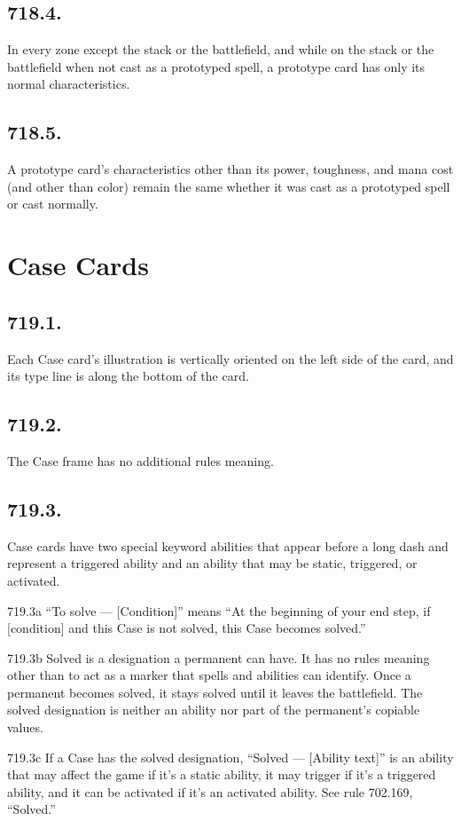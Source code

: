\subsection*{718.4.}
In every zone except the stack or the battlefield, and while on the stack or the battlefield when not cast as a prototyped spell, a prototype card has only its normal characteristics.

\subsection*{718.5.}
A prototype card’s characteristics other than its power, toughness, and mana cost (and other than color) remain the same whether it was cast as a prototyped spell or cast normally.

\section{Case Cards}
\subsection*{719.1.}
Each Case card’s illustration is vertically oriented on the left side of the card, and its type line is along the bottom of the card.

\subsection*{719.2.}
The Case frame has no additional rules meaning.

\subsection*{719.3.}
Case cards have two special keyword abilities that appear before a long dash and represent a triggered ability and an ability that may be static, triggered, or activated.

719.3a “To solve — [Condition]” means “At the beginning of your end step, if [condition] and this Case is not solved, this Case becomes solved.”

719.3b Solved is a designation a permanent can have. It has no rules meaning other than to act as a marker that spells and abilities can identify. Once a permanent becomes solved, it stays solved until it leaves the battlefield. The solved designation is neither an ability nor part of the permanent’s copiable values.

719.3c If a Case has the solved designation, “Solved — [Ability text]” is an ability that may affect the game if it’s a static ability, it may trigger if it’s a triggered ability, and it can be activated if it’s an activated ability. See rule 702.169, “Solved.”


